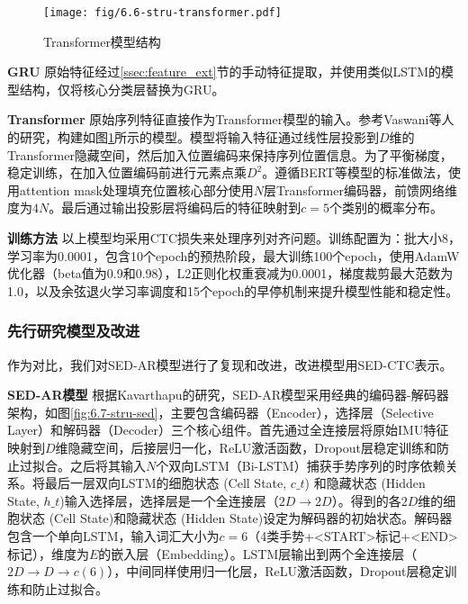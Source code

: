 \begin{figure}
    \centering
    \texttt{[image: fig/6.6-stru-transformer.pdf]}
    \caption{Transformer模型结构}
    \label{fig:6.6-stru-transformer}
\end{figure}

\textbf{GRU}\hspace{5pt} 原始特征经过\ref{ssec:feature_ext}节的手动特征提取，并使用类似LSTM的模型结构，仅将核心分类层替换为GRU。

\textbf{Transformer}\hspace{5pt} 原始序列特征直接作为Transformer模型的输入。参考Vaswani\cite{vaswani2017attention}等人的研究，构建如图\ref{fig:6.6-stru-transformer}所示的模型。模型将输入特征通过线性层投影到$D$维的Transformer隐藏空间，然后加入位置编码来保持序列位置信息。为了平衡梯度，稳定训练，在加入位置编码前进行元素点乘$D^2$。遵循BERT等模型的标准做法，使用attention mask处理填充位置\cite{devlin2019bert}核心部分使用$N$层Transformer编码器，前馈网络维度为$4N$。最后通过输出投影层将编码后的特征映射到$c=5$个类别的概率分布。

\textbf{训练方法}\hspace{5pt} 以上模型均采用CTC损失来处理序列对齐问题。训练配置为：批大小8，学习率为0.0001，包含10个epoch的预热阶段，最大训练100个epoch，使用AdamW优化器（beta值为0.9和0.98），L2正则化权重衰减为0.0001，梯度裁剪最大范数为1.0，以及余弦退火学习率调度和15个epoch的早停机制来提升模型性能和稳定性。

\subsubsection{先行研究模型及改进}\label{sssec:sed_ar_ctc}

作为对比，我们对SED-AR模型进行了复现和改进，改进模型用SED-CTC表示。

\textbf{SED-AR模型}\hspace{5pt} 根据Kavarthapu\cite{kavarthapu2017hand}的研究，SED-AR模型采用经典的编码器-解码器架构，如图\ref{fig:6.7-stru-sed}，主要包含编码器（Encoder），选择层（Selective Layer）和解码器（Decoder）三个核心组件。首先通过全连接层将原始IMU特征映射到$D$维隐藏空间，后接层归一化，ReLU激活函数，Dropout层稳定训练和防止过拟合。之后将其输入$N$个双向LSTM（Bi-LSTM）捕获手势序列的时序依赖关系。将最后一层双向LSTM的细胞状态 (Cell State, $c\_t$)	和隐藏状态 (Hidden State, $h\_t$)输入选择层，选择层是一个全连接层（$2D\to2D$）。得到的各$2D$维的细胞状态 (Cell State)和隐藏状态 (Hidden State)设定为解码器的初始状态。解码器包含一个单向LSTM，输入词汇大小为$c=6$（4类手势+<START>标记+<END>标记），维度为$E$的嵌入层（Embedding）。LSTM层输出到两个全连接层（$2D\to D\to c(6)$），中间同样使用归一化层，ReLU激活函数，Dropout层稳定训练和防止过拟合。

